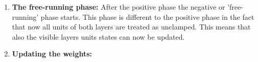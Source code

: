 \documentclass[12pt,twoside]{article}
\theoremstyle{plain}
\theoremstyle{definition}
\theoremstyle{remark}
\begin{document}
\begin{enumerate}
    \item \textbf{The free-running phase:}\newline
        After the positive phase the negative or 'free-running' phase starts. This phase is different to the positive phase in the fact that
        now all units of both layers are treated as unclamped. This means that also the visible layers units states can now be updated.

    \item \textbf{Updating the weights:}\newline
\end{enumerate}

\end{document}
